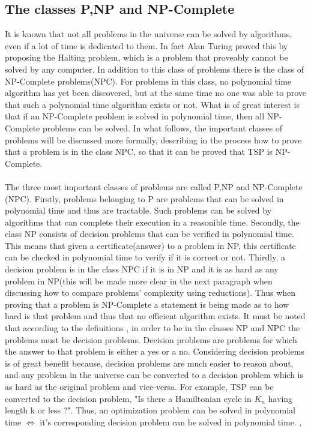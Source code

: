 \documentclass{article}
\begin{document}
\subsection{The classes P,NP and NP-Complete}
It is known that not all problems in the universe can be solved by algorithms, even if a lot of time is dedicated to them. In fact Alan Turing proved this by proposing the Halting problem, which is a problem that proveably cannot be solved by any computer. In addition to this class of problems there is the class of NP-Complete problems(NPC). For problems in this class, no polynomial time algorithm has yet been discovered, but at the same time no one was able to prove that such a polynomial time algorithm exists or not. What is of great interest is that if an NP-Complete problem is solved in polynomial time, then all NP-Complete problems can be solved.  In what follows, the important classes of problems will be discussed more formally, describing in the process how to prove that a problem is in the class NPC, so that it can be proved that TSP is NP-Complete.  \cite{geeksforgeeks_2018_2}\\
\\
The three most important classes of problems are called P,NP and NP-Complete (NPC). Firstly, problems belonging to P are problems that can be solved in polynomial time and thus are tractable. Such problems can be solved by algorithms that can complete their execution in a reasonible time. Secondly, the class NP consists of decision problems that can be verified in polynomial time. This means that given a certificate(answer) to a problem in NP, this certificate can be checked in polynomial time to verify if it is correct or not. Thirdly, a decision problem is in the class NPC if it is in NP and it is as hard as any problem in NP(this will be made more clear in the next paragraph when discussing how to compare problems' complexity using reductions). Thus when proving that a problem is NP-Complete a statement is being made as to how hard is that problem and thus that no efficient algorithm exists. It must be noted that according to the definitions , in order to be in the classes NP and NPC the problems must be decision problems. Decision problems are problems for which the answer to that problem is either a yes or a no. Considering decision problems is of great benefit because, decision problems are much easier to reason about, and any problem in the universe can be converted to a decision problem which is as hard as the original problem and vice-versa. For example, TSP can be converted to the decision problem, "Is there a Hamiltonian cycle in $K_n$ having length k or less ?". Thus, an optimization problem can be solved in polynomial time $\iff$ it's corresponding decision problem can be solved in polynomial time.  \cite{cormen_leiserson_rivest_stein}, \cite{problems_in_computer_science} \\
\end{document}
